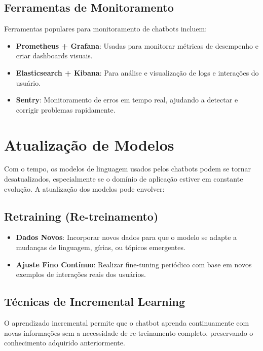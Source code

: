 \documentclass[14pt,a4paper,oneside]{book}
\begin{document}
\subsection{Ferramentas de Monitoramento}

Ferramentas populares para monitoramento de chatbots incluem:

\begin{itemize}
	\item \textbf{Prometheus + Grafana}: Usadas para monitorar métricas de desempenho e criar dashboards visuais.
	\item \textbf{Elasticsearch + Kibana}: Para análise e visualização de logs e interações do usuário.
	\item \textbf{Sentry}: Monitoramento de erros em tempo real, ajudando a detectar e corrigir problemas rapidamente.
\end{itemize}

\section{Atualização de Modelos}

Com o tempo, os modelos de linguagem usados pelos chatbots podem se tornar desatualizados, especialmente se o domínio de aplicação estiver em constante evolução. A atualização dos modelos pode envolver:

\subsection{Retraining (Re-treinamento)}

\begin{itemize}
	\item \textbf{Dados Novos}: Incorporar novos dados para que o modelo se adapte a mudanças de linguagem, gírias, ou tópicos emergentes.
	\item \textbf{Ajuste Fino Contínuo}: Realizar fine-tuning periódico com base em novos exemplos de interações reais dos usuários.
\end{itemize}

\subsection{Técnicas de Incremental Learning}

O aprendizado incremental permite que o chatbot aprenda continuamente com novas informações sem a necessidade de re-treinamento completo, preservando o conhecimento adquirido anteriormente.
\end{document}

